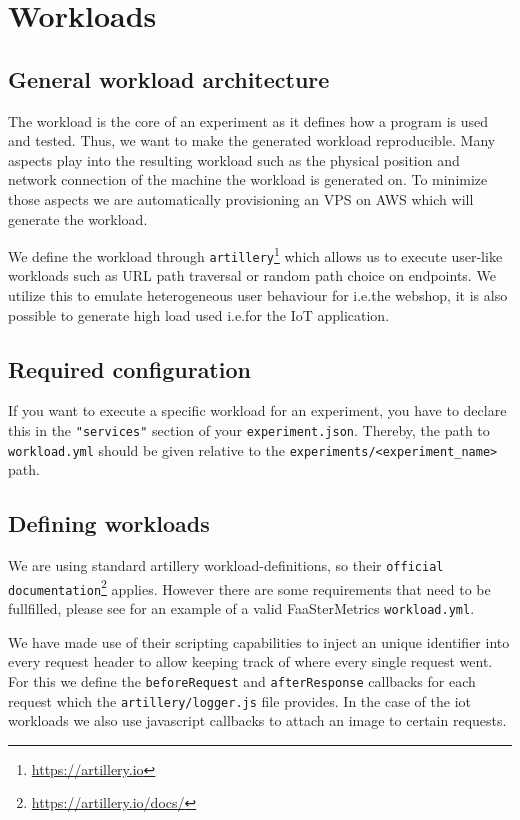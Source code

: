 \documentclass[../main.tex]{subfiles}
\begin{document}
\section{Workloads}\label{sec:WorkloadsStructure}

\subsection{General workload architecture} %

The workload is the core of an experiment as it defines how a program is used and tested. 
Thus, we want to make the generated workload reproducible. 
Many aspects play into the resulting workload such as the physical position and network connection of the machine the workload is generated on. 
To minimize those aspects we are automatically provisioning an VPS on AWS which will generate the workload.

We define the workload through \texttt{artillery}\footnote{\url{https://artillery.io}} which allows us to 
execute user-like workloads such as URL path traversal or random path choice on endpoints. 
We utilize this to emulate heterogeneous user behaviour for i.e.\@ the webshop, 
it is also possible to generate high load used i.e.\@ for the IoT application.

\subsection{Required configuration}


If you want to execute a specific workload for an experiment, 
you have to declare this in the \texttt{"services"} section of your \texttt{experiment.json}.
Thereby, the path to \texttt{workload.yml} should be given relative to the \texttt{experiments/<experiment\_name>} path. 

\subsection{Defining workloads}

We are using standard artillery workload-definitions, 
so their \texttt{official documentation}\footnote{\url{https://artillery.io/docs/}} applies. 
However there are some requirements that need to be fullfilled, 
please see  for an example of a valid FaaSterMetrics \texttt{workload.yml}.

We have made use of their scripting capabilities to inject an unique identifier 
into every request header to allow keeping track of where every single request went. 
For this we define the \texttt{beforeRequest} and \texttt{afterResponse} callbacks for each request 
which the \texttt{artillery/logger.js} file provides.
In the case of the iot workloads we also use javascript callbacks to attach an image to certain requests.
\end{document}
